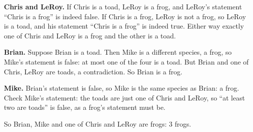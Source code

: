 \textbf{Chris and LeRoy.} If Chris is a toad, LeRoy is a frog, and LeRoy's statement ``Chris is a frog'' is indeed false. If Chris is a frog, LeRoy is not a frog, so LeRoy is a toad, and his statement ``Chris is a frog'' is indeed true. Either way exactly one of Chris and LeRoy is a frog and the other is a toad.

\textbf{Brian.} Suppose Brian is a toad. Then Mike is a different species, a frog, so Mike's statement is false: at most one of the four is a toad. But Brian and one of Chris, LeRoy are toads, a contradiction. So Brian is a frog.

\textbf{Mike.} Brian's statement is false, so Mike is the same species as Brian: a frog. Check Mike's statement: the toads are just one of Chris and LeRoy, so ``at least two are toads'' is false, as a frog's statement must be.

So Brian, Mike and one of Chris and LeRoy are frogs: $\boxed{3}$ frogs.
